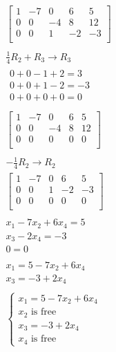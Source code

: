 \documentclass[12pt letter]{report}
\begin{document}
{\begin{enumerate}
\begin{align*}
            \begin{bmatrix}
              1 & -7 & 0  & 6  & 5  \\
              0 & 0  & -4 & 8  & 12 \\
              0 & 0  & 1  & -2 & -3 \\
            \end{bmatrix}        \\
            \\
            \frac{1}{4}R_2 + R_3 \to R_3 \\
            \begin{split}
              0 + 0 -1 + 2 = 3   \\
              0 + 0 + 1 - 2 = -3 \\
              \hline
              0 + 0 + 0 + 0 = 0  \\
            \end{split}           \\
            \begin{bmatrix}
              1 & -7 & 0  & 6 & 5  \\
              0 & 0  & -4 & 8 & 12 \\
              0 & 0  & 0  & 0 & 0  \\
            \end{bmatrix}         \\
            \\
            -\frac{1}{4}R_2 \to R_2      \\
            \begin{bmatrix}
              1 & -7 & 0 & 6  & 5  \\
              0 & 0  & 1 & -2 & -3 \\
              0 & 0  & 0 & 0  & 0  \\
            \end{bmatrix}         \\
            \\
            x_1 - 7x_2 + 6x_4 = 5        \\
            x_3 - 2x_4 = -3              \\
            0 = 0                        \\
            \\
            x_1 = 5 - 7x_2 + 6x_4        \\
            x_3 = -3 + 2x_4              \\
            \\
            \begin{cases}
              x_1 = 5 - 7x_2 + 6x_4 \\
              x_2 \text{ is free }  \\
              x_3 = -3 + 2x_4       \\
              x_4 \text{ is free }
            \end{cases}
          \end{align*}
  \end{enumerate}
}
\end{document}
